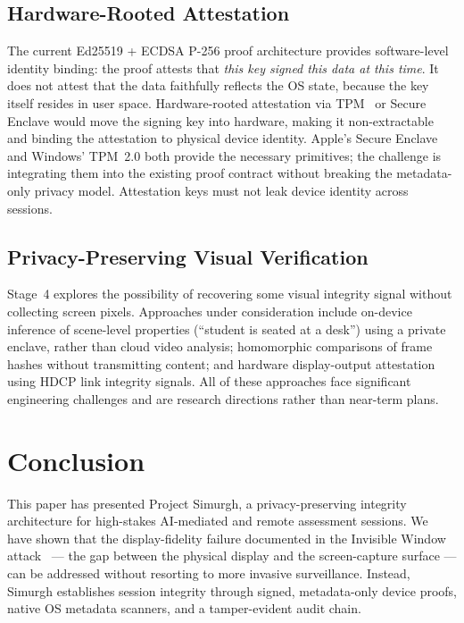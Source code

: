 \documentclass[conference]{IEEEtran}
\begin{document}
\subsection{Hardware-Rooted Attestation}

The current Ed25519 + ECDSA P-256 proof architecture provides software-level identity binding: the proof attests that \textit{this key signed this data at this time}. It does not attest that the data faithfully reflects the OS state, because the key itself resides in user space. Hardware-rooted attestation via TPM~\cite{tpm2spec} or Secure Enclave would move the signing key into hardware, making it non-extractable and binding the attestation to physical device identity. Apple's Secure Enclave and Windows' TPM~2.0 both provide the necessary primitives; the challenge is integrating them into the existing proof contract without breaking the metadata-only privacy model. Attestation keys must not leak device identity across sessions.

\subsection{Privacy-Preserving Visual Verification}

Stage~4 explores the possibility of recovering some visual integrity signal without collecting screen pixels. Approaches under consideration include on-device inference of scene-level properties (``student is seated at a desk'') using a private enclave, rather than cloud video analysis; homomorphic comparisons of frame hashes without transmitting content; and hardware display-output attestation using HDCP link integrity signals. All of these approaches face significant engineering challenges and are research directions rather than near-term plans.

\section{Conclusion}

This paper has presented Project Simurgh, a privacy-preserving integrity architecture for high-stakes AI-mediated and remote assessment sessions. We have shown that the display-fidelity failure documented in the Invisible Window attack~\cite{abedini2026invisible} — the gap between the physical display and the screen-capture surface — can be addressed without resorting to more invasive surveillance. Instead, Simurgh establishes session integrity through signed, metadata-only device proofs, native OS metadata scanners, and a tamper-evident audit chain.
\end{document}
